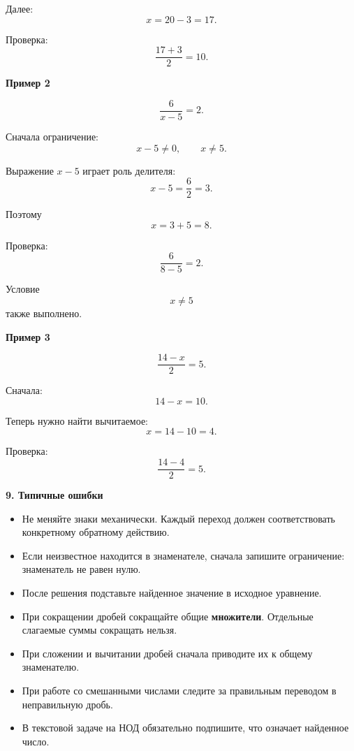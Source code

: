 \documentclass[a4paper,12pt]{article}
\newcommand{\subhead}[1]{%
    \vspace{0.25em}
    {\large\bfseries\textcolor{darkaccent}{#1}}\par
    \vspace{0.1em}
}
\begin{document}
Далее:
\[
x=20-3=17.
\]

Проверка:
\[
\frac{17+3}{2}=10.
\]

\textbf{Пример 2}

\[
\frac{6}{x-5}=2.
\]

Сначала ограничение:
\[
x-5\ne0,
\qquad
x\ne5.
\]

Выражение $x-5$ играет роль делителя:
\[
x-5=\frac62=3.
\]

Поэтому
\[
x=3+5=8.
\]

Проверка:
\[
\frac{6}{8-5}=2.
\]

Условие
\[
x\ne5
\]
также выполнено.

\textbf{Пример 3}

\[
\frac{14-x}{2}=5.
\]

Сначала:
\[
14-x=10.
\]

Теперь нужно найти вычитаемое:
\[
x=14-10=4.
\]

Проверка:
\[
\frac{14-4}{2}=5.
\]


\subhead{9. Типичные ошибки}

\begin{itemize}

\item
Не меняйте знаки механически.
Каждый переход должен соответствовать
конкретному обратному действию.

\item
Если неизвестное находится в знаменателе,
сначала запишите ограничение:
знаменатель не равен нулю.

\item
После решения подставьте найденное значение
в исходное уравнение.

\item
При сокращении дробей сокращайте
общие \textbf{множители}.
Отдельные слагаемые суммы сокращать нельзя.

\item
При сложении и вычитании дробей
сначала приводите их к общему знаменателю.

\item
При работе со смешанными числами
следите за правильным переводом
в неправильную дробь.

\item
В текстовой задаче на НОД
обязательно подпишите,
что означает найденное число.

\end{itemize}
\end{document}
